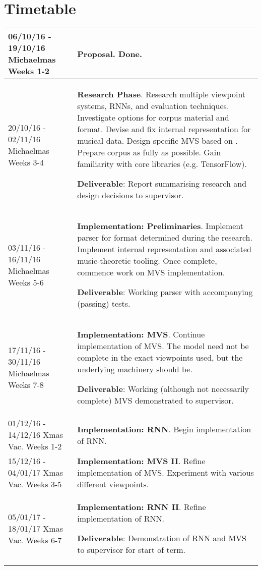 \documentclass[12pt,a4paper,twoside]{article}
\begin{document}
\newpage

\section*{Timetable}

\begin{longtable}{ p{4cm} | p{11cm} } \hline 

06/10/16 - 19/10/16 Michaelmas Weeks 1-2 & \textbf{Proposal}. Done. \\ \hline
20/10/16 - 02/11/16 Michaelmas Weeks 3-4 & \textbf{Research Phase}. 
Research multiple viewpoint systems, RNNs, and evaluation techniques.
Investigate options for corpus material and format. Devise and fix internal
representation for musical data. Design specific MVS based on
\cite{whorley2013phd}. Prepare corpus as fully as possible. Gain familiarity
with core libraries (e.g. TensorFlow).

\textbf{Deliverable}: Report summarising research and design decisions to
supervisor.
\\ \hline
03/11/16 - 16/11/16 Michaelmas Weeks 5-6 & \textbf{Implementation:
	Preliminaries}.
Implement parser for format determined during the research.  Implement internal
representation and associated music-theoretic tooling. Once complete, commence
work on MVS implementation.

\textbf{Deliverable}: Working parser with accompanying (passing) tests.
\\ \hline

17/11/16 - 30/11/16 Michaelmas Weeks 7-8 & \textbf{Implementation: MVS}.
Continue implementation of MVS. The model need not be complete in the exact
viewpoints used, but the underlying machinery should be.

\textbf{Deliverable}: Working (although not necessarily complete) MVS
demonstrated to supervisor.
\\ \hline

01/12/16 - 14/12/16 Xmas Vac. Weeks 1-2 & \textbf{Implementation: RNN}.
Begin implementation of RNN.  \\ \hline
15/12/16 - 04/01/17 Xmas Vac. Weeks 3-5 & \textbf{Implementation: MVS II}.
Refine implementation of MVS. Experiment with various different viewpoints.

\\ \hline
05/01/17 - 18/01/17 Xmas Vac. Weeks 6-7 & \textbf{Implementation: RNN II}.
Refine implementation of RNN. 

\textbf{Deliverable}: Demonstration of RNN and MVS to supervisor for start of
term.
\\ \hline


\end{longtable}
\end{document}

